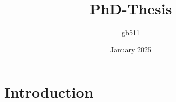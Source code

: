 \documentclass{article}
\title{PhD-Thesis}
\author{gb511 }
\date{January 2025}
\begin{document}
\maketitle

\section{Introduction}
\end{document}
